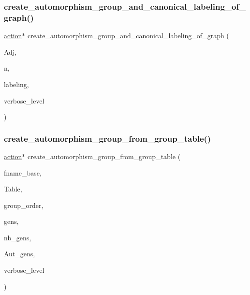 \subsubsection{\texorpdfstring{create\+\_\+automorphism\+\_\+group\+\_\+and\+\_\+canonical\+\_\+labeling\+\_\+of\+\_\+graph()}{create\_automorphism\_group\_and\_canonical\_labeling\_of\_graph()}}
{\footnotesize\ttfamily \mbox{\hyperlink{classaction}{action}}$\ast$ create\+\_\+automorphism\+\_\+group\+\_\+and\+\_\+canonical\+\_\+labeling\+\_\+of\+\_\+graph (\begin{DoxyParamCaption}\item[{\mbox{\hyperlink{galois_8h_a09fddde158a3a20bd2dcadb609de11dc}{I\+NT}} $\ast$}]{Adj,  }\item[{\mbox{\hyperlink{galois_8h_a09fddde158a3a20bd2dcadb609de11dc}{I\+NT}}}]{n,  }\item[{\mbox{\hyperlink{galois_8h_a09fddde158a3a20bd2dcadb609de11dc}{I\+NT}} $\ast$}]{labeling,  }\item[{\mbox{\hyperlink{galois_8h_a09fddde158a3a20bd2dcadb609de11dc}{I\+NT}}}]{verbose\+\_\+level }\end{DoxyParamCaption})}

\mbox{\label{action__global_8_c_a26edd2b6827b6f73bd0d09a6afb6d55b}} 
\subsubsection{\texorpdfstring{create\+\_\+automorphism\+\_\+group\+\_\+from\+\_\+group\+\_\+table()}{create\_automorphism\_group\_from\_group\_table()}}
{\footnotesize\ttfamily \mbox{\hyperlink{classaction}{action}}$\ast$ create\+\_\+automorphism\+\_\+group\+\_\+from\+\_\+group\+\_\+table (\begin{DoxyParamCaption}\item[{const \mbox{\hyperlink{galois_8h_ab6cc7b4aeb6ea31aba2b3fbfc83ff5e6}{B\+Y\+TE}} $\ast$}]{fname\+\_\+base,  }\item[{\mbox{\hyperlink{galois_8h_a09fddde158a3a20bd2dcadb609de11dc}{I\+NT}} $\ast$}]{Table,  }\item[{\mbox{\hyperlink{galois_8h_a09fddde158a3a20bd2dcadb609de11dc}{I\+NT}}}]{group\+\_\+order,  }\item[{\mbox{\hyperlink{galois_8h_a09fddde158a3a20bd2dcadb609de11dc}{I\+NT}} $\ast$}]{gens,  }\item[{\mbox{\hyperlink{galois_8h_a09fddde158a3a20bd2dcadb609de11dc}{I\+NT}}}]{nb\+\_\+gens,  }\item[{\mbox{\hyperlink{classstrong__generators}{strong\+\_\+generators}} $\ast$\&}]{Aut\+\_\+gens,  }\item[{\mbox{\hyperlink{galois_8h_a09fddde158a3a20bd2dcadb609de11dc}{I\+NT}}}]{verbose\+\_\+level }\end{DoxyParamCaption})}

